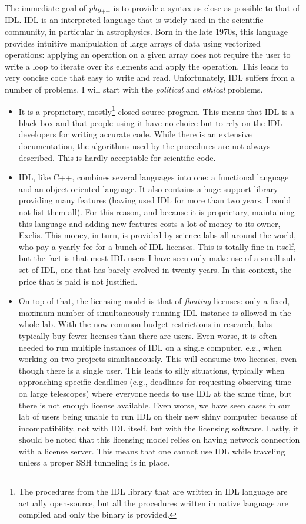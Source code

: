 \documentclass[12pt,a4paper]{report}
\newcommand{\phypp}{\textit{phy}$_{\text{++}}$\xspace}
\begin{document}
The immediate goal of \phypp is to provide a syntax as close as possible to that of IDL. IDL is an interpreted language that is widely used in the scientific community, in particular in astrophysics. Born in the late 1970s, this language provides intuitive manipulation of large arrays of data using vectorized operations: applying an operation on a given array does not require the user to write a loop to iterate over its elements and apply the operation. This leads to very concise code that easy to write and read. Unfortunately, IDL suffers from a number of problems. I will start with the \emph{political} and \emph{ethical} problems.
\begin{itemize}
\item It is a proprietary, mostly\footnote{The procedures from the IDL library that are written in IDL language are actually open-source, but all the procedures written in native language are compiled and only the binary is provided.} closed-source program. This means that IDL is a black box and that people using it have no choice but to rely on the IDL developers for writing accurate code. While there is an extensive documentation, the algorithms used by the procedures are not always described. This is hardly acceptable for scientific code.
\item IDL, like C++, combines several languages into one: a functional language and an object-oriented language. It also contains a huge support library providing many features (having used IDL for more than two years, I could not list them all). For this reason, and because it is proprietary, maintaining this language and adding new features costs a lot of money to its owner, Exelis. This money, in turn, is provided by science labs all around the world, who pay a yearly fee for a bunch of IDL licenses. This is totally fine in itself, but the fact is that most IDL users I have seen only make use of a small sub-set of IDL, one that has barely evolved in twenty years. In this context, the price that is paid is not justified.
\item On top of that, the licensing model is that of \emph{floating} licenses: only a fixed, maximum number of simultaneously running IDL instance is allowed in the whole lab. With the now common budget restrictions in research, labs typically buy fewer licenses than there are users. Even worse, it is often needed to run multiple instances of IDL on a single computer, e.g., when working on two projects simultaneously. This will consume two licenses, even though there is a single user. This leads to silly situations, typically when approaching specific deadlines (e.g., deadlines for requesting observing time on large telescopes) where everyone needs to use IDL at the same time, but there is not enough license available. Even worse, we have seen cases in our lab of users being unable to run IDL on their new shiny computer because of incompatibility, not with IDL itself, but with the licensing software. Lastly, it should be noted that this licensing model relies on having network connection with a license server. This means that one cannot use IDL while traveling unless a proper SSH tunneling is in place.
\end{itemize}
\end{document}
